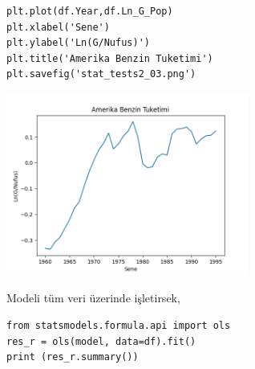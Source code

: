 \documentclass[12pt,fleqn]{article}\usepackage{../../common}
\begin{document}
\begin{verbatim}
plt.plot(df.Year,df.Ln_G_Pop)
plt.xlabel('Sene')
plt.ylabel('Ln(G/Nufus)')
plt.title('Amerika Benzin Tuketimi')
plt.savefig('stat_tests2_03.png')
\end{verbatim}

\includegraphics[height=6cm]{stat_tests2_03.png}

Modeli tüm veri üzerinde işletirsek,

\begin{verbatim}
from statsmodels.formula.api import ols
res_r = ols(model, data=df).fit()
print (res_r.summary())
\end{verbatim}
\end{document}
